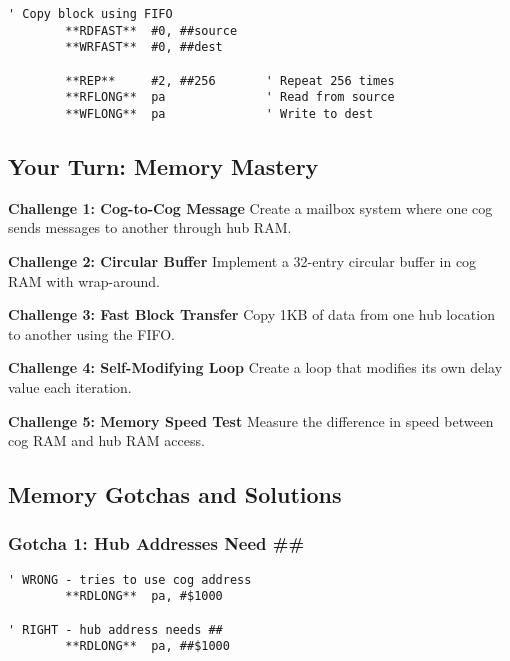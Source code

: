 \documentclass[11pt]{book}
\begin{document}
\begin{lstlisting}
' Copy block using FIFO
        **RDFAST**  #0, ##source
        **WRFAST**  #0, ##dest
        
        **REP**     #2, ##256       ' Repeat 256 times
        **RFLONG**  pa              ' Read from source
        **WFLONG**  pa              ' Write to dest
\end{lstlisting}

\hypertarget{your-turn-memory-mastery}{%
\subsection{Your Turn: Memory Mastery}\label{your-turn-memory-mastery}}

\begin{yourturn}
\textbf{Challenge 1: Cog-to-Cog Message}
Create a mailbox system where one cog sends messages to another through hub RAM.

\textbf{Challenge 2: Circular Buffer}
Implement a 32-entry circular buffer in cog RAM with wrap-around.

\textbf{Challenge 3: Fast Block Transfer}
Copy 1KB of data from one hub location to another using the FIFO.

\textbf{Challenge 4: Self-Modifying Loop}
Create a loop that modifies its own delay value each iteration.

\textbf{Challenge 5: Memory Speed Test}
Measure the difference in speed between cog RAM and hub RAM access.
\end{yourturn}

\hypertarget{memory-gotchas-and-solutions}{%
\subsection{Memory Gotchas and
Solutions}\label{memory-gotchas-and-solutions}}

\hypertarget{gotcha-1-hub-addresses-need}{%
\subsubsection{Gotcha 1: Hub Addresses Need
\#\#}\label{gotcha-1-hub-addresses-need}}

\begin{lstlisting}
' WRONG - tries to use cog address
        **RDLONG**  pa, #$1000      
        
' RIGHT - hub address needs ##
        **RDLONG**  pa, ##$1000
\end{lstlisting}
\end{document}
